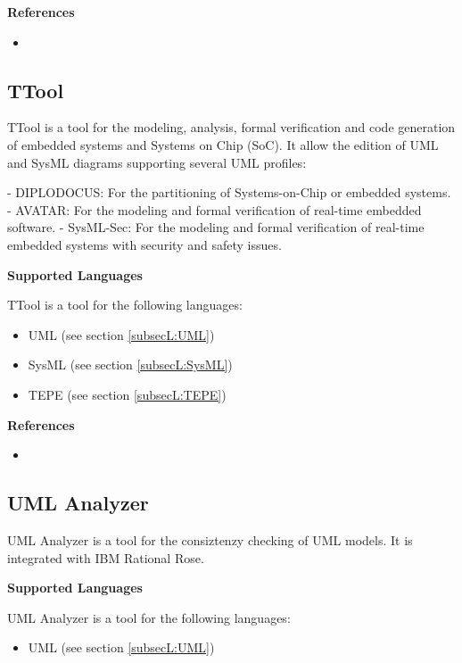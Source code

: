 \textbf{References}
\begin{itemize}
	
\item {}
\end{itemize}



\subsection{TTool}
\label{subsecT:TTool}


TTool is a tool for the modeling, analysis, formal verification and code generation of embedded systems and Systems on Chip (SoC). It allow the edition of UML and SysML diagrams supporting several UML profiles:

- DIPLODOCUS: For the partitioning of Systems-on-Chip or embedded systems.
- AVATAR: For the modeling and formal verification of real-time embedded software.
- SysML-Sec: For the modeling and formal verification of real-time embedded systems with security and safety issues.

\textbf{Supported Languages}

TTool is a tool for the following languages:
\begin{itemize}
	\item UML (see section \ref{subsecL:UML})
	\item SysML (see section \ref{subsecL:SysML})
	\item TEPE (see section \ref{subsecL:TEPE})
\end{itemize}


\textbf{References}
\begin{itemize}
	
\item {}
\end{itemize}



\subsection{UML Analyzer}
\label{subsecT:UMLAnalyzer}


UML Analyzer is a tool for the consiztenzy checking of UML models. It is integrated with IBM Rational Rose.

\textbf{Supported Languages}

UML Analyzer is a tool for the following languages:
\begin{itemize}
	\item UML (see section \ref{subsecL:UML})
\end{itemize}


